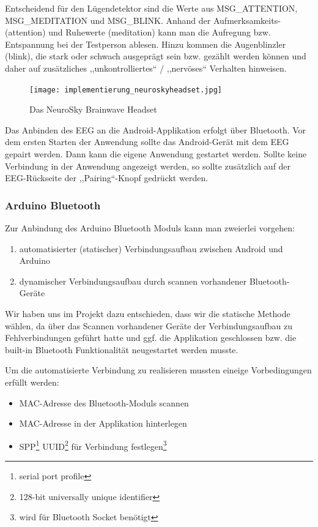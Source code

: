 	Entscheidend für den Lügendetektor sind die Werte aus MSG\_ATTENTION, \\MSG\_MEDITATION und MSG\_BLINK. Anhand der Aufmerksamkeits- (attention) und Ruhewerte (meditation) kann man die Aufregung bzw. Entspannung bei der Testperson ablesen. Hinzu kommen die Augenblinzler (blink), die stark oder schwach ausgeprägt sein bzw. gezählt werden können und daher auf zusätzliches ,,unkontrolliertes`` / ,,nervöses`` Verhalten hinweisen.
	
	\begin{figure}[h!btp]
	\centering
	\texttt{[image: implementierung\_neuroskyheadset.jpg]}
	\caption{Das NeuroSky Brainwave Headset}
	\label{fig:Brainwave-Headset}
	\end{figure}
	
	Das Anbinden des EEG an die Android-Applikation erfolgt über Bluetooth. Vor dem ersten Starten der Anwendung sollte das Android-Gerät mit dem EEG gepairt werden. Dann kann die eigene Anwendung gestartet werden. Sollte keine Verbindung in der Anwendung angezeigt werden, so sollte zusätzlich auf der EEG-Rückseite der ,,Pairing``-Knopf gedrückt werden.
	
	\subsubsection{Arduino Bluetooth}
			
	Zur Anbindung des Arduino Bluetooth Moduls kann man zweierlei vorgehen:
	\begin{enumerate}
	\item automatisierter (statischer) Verbindungsaufbau zwischen Android und Arduino
	\item dynamischer Verbindungsaufbau durch scannen vorhandener Bluetooth-Geräte
	\end{enumerate}
	
	Wir haben uns im Projekt dazu entschieden, dass wir die statische Methode wählen, da über das Scannen vorhandener Geräte der Verbindungsaufbau zu Fehlverbindungen geführt hatte und ggf. die Applikation geschlossen bzw. die built-in Bluetooth Funktionalität neugestartet werden musste. 
	
	Um die automatisierte Verbindung zu realisieren mussten eineige Vorbedingungen erfüllt werden:
	\begin{itemize}
	\item MAC-Adresse des Bluetooth-Moduls scannen
	\item MAC-Adresse in der Applikation hinterlegen
	\item SPP\footnote{serial port profile} UUID\footnote{128-bit universally unique identifier} für Verbindung festlegen\footnote{wird für Bluetooth Socket benötigt}
	\end{itemize}
	
